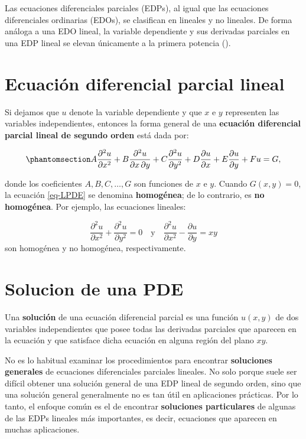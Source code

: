 \documentclass[
  spanish,
  us-letterpaper,
  DIV=11,
  numbers=noendperiod]{scrreprt}
\theoremstyle{plain}
\theoremstyle{definition}
\theoremstyle{remark}
\begin{document}
Las ecuaciones diferenciales parciales (EDPs), al igual que las
ecuaciones diferenciales ordinarias (EDOs), se clasifican en lineales y
no lineales. De forma análoga a una EDO lineal, la variable dependiente
y sus derivadas parciales en una EDP lineal se elevan únicamente a la
primera potencia ().

\section{Ecuación diferencial parcial
lineal}\label{ecuaciuxf3n-diferencial-parcial-lineal}

Si dejamos que \(u\) denote la variable dependiente y que \(x\) e \(y\)
representen las variables independientes, entonces la forma general de
una \textbf{ecuación diferencial parcial lineal de segundo orden} está
dada por:

\begin{equation}\phantomsection\label{eq-LPDE}{
A \dfrac{\partial^2 u}{\partial x^2} + B \dfrac{\partial^2 u}{\partial x \, \partial y} + C \dfrac{\partial^2 u}{\partial y^2} + D \dfrac{\partial u}{\partial x} + E \dfrac{\partial u}{\partial y} + F u = G,
}\end{equation}

donde los coeficientes \(A, B, C, \dots, G\) son funciones de \(x\) e
\(y\). Cuando \(G(x, y) = 0\), la ecuación \ref{eq-LPDE} se denomina
\textbf{homogénea}; de lo contrario, es \textbf{no homogénea}. Por
ejemplo, las ecuaciones lineales:

\[
\dfrac{\partial^2 u}{\partial x^2} + \dfrac{\partial^2 u}{\partial y^2} = 0 \quad\text{y} \quad \dfrac{\partial^2 u}{\partial x^2} - \dfrac{\partial u}{\partial y} = x y
\] son homogénea y no homogénea, respectivamente.

\section{Solucion de una PDE}\label{solucion-de-una-pde}

Una \textbf{solución} de una ecuación diferencial parcial es una función
\(u(x, y)\) de dos variables independientes que posee todas las
derivadas parciales que aparecen en la ecuación y que satisface dicha
ecuación en alguna región del plano \(xy\).

No es lo habitual examinar los procedimientos para encontrar
\textbf{soluciones generales} de ecuaciones diferenciales parciales
lineales. No solo porque suele ser difícil obtener una solución general
de una EDP lineal de segundo orden, sino que una solución general
generalmente no es tan útil en aplicaciones prácticas. Por lo tanto, el
enfoque común es el de encontrar \textbf{soluciones particulares} de
algunas de las EDPs lineales más importantes, es decir, ecuaciones que
aparecen en muchas aplicaciones.
\end{document}
